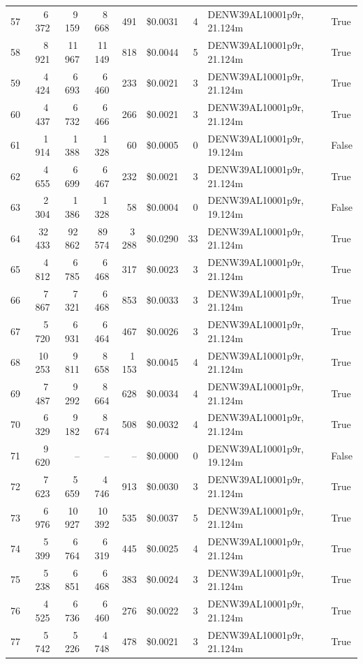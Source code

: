 \documentclass[a4paper,11pt]{article}
\begin{document}
\begin{table}[ht]
\begin{tabular}{r r r r r r r p{3cm} l}
57 & 6\,372 & 9\,159 & 8\,668 & 491 & \$0.0031 & 4 & DENW39AL10001p9r, 21.124m & True \\
58 & 8\,921 & 11\,967 & 11\,149 & 818 & \$0.0044 & 5 & DENW39AL10001p9r, 21.124m & True \\
59 & 4\,424 & 6\,693 & 6\,460 & 233 & \$0.0021 & 3 & DENW39AL10001p9r, 21.124m & True \\
60 & 4\,437 & 6\,732 & 6\,466 & 266 & \$0.0021 & 3 & DENW39AL10001p9r, 21.124m & True \\
61 & 1\,914 & 1\,388 & 1\,328 & 60 & \$0.0005 & 0 & DENW39AL10001p9r, 19.124m & False \\
62 & 4\,655 & 6\,699 & 6\,467 & 232 & \$0.0021 & 3 & DENW39AL10001p9r, 21.124m & True \\
63 & 2\,304 & 1\,386 & 1\,328 & 58 & \$0.0004 & 0 & DENW39AL10001p9r, 19.124m & False \\
64 & 32\,433 & 92\,862 & 89\,574 & 3\,288 & \$0.0290 & 33 & DENW39AL10001p9r, 21.124m & True \\
65 & 4\,812 & 6\,785 & 6\,468 & 317 & \$0.0023 & 3 & DENW39AL10001p9r, 21.124m & True \\
66 & 7\,867 & 7\,321 & 6\,468 & 853 & \$0.0033 & 3 & DENW39AL10001p9r, 21.124m & True \\
67 & 5\,720 & 6\,931 & 6\,464 & 467 & \$0.0026 & 3 & DENW39AL10001p9r, 21.124m & True \\
68 & 10\,253 & 9\,811 & 8\,658 & 1\,153 & \$0.0045 & 4 & DENW39AL10001p9r, 21.124m & True \\
69 & 7\,487 & 9\,292 & 8\,664 & 628 & \$0.0034 & 4 & DENW39AL10001p9r, 21.124m & True \\
70 & 6\,329 & 9\,182 & 8\,674 & 508 & \$0.0032 & 4 & DENW39AL10001p9r, 21.124m & True \\
71 & 9\,620 & -- & -- & -- & \$0.0000 & 0 & DENW39AL10001p9r, 19.124m & False \\
72 & 7\,623 & 5\,659 & 4\,746 & 913 & \$0.0030 & 3 & DENW39AL10001p9r, 21.124m & True \\
73 & 6\,976 & 10\,927 & 10\,392 & 535 & \$0.0037 & 5 & DENW39AL10001p9r, 21.124m & True \\
74 & 5\,399 & 6\,764 & 6\,319 & 445 & \$0.0025 & 4 & DENW39AL10001p9r, 21.124m & True \\
75 & 5\,238 & 6\,851 & 6\,468 & 383 & \$0.0024 & 3 & DENW39AL10001p9r, 21.124m & True \\
76 & 4\,525 & 6\,736 & 6\,460 & 276 & \$0.0022 & 3 & DENW39AL10001p9r, 21.124m & True \\
77 & 5\,742 & 5\,226 & 4\,748 & 478 & \$0.0021 & 3 & DENW39AL10001p9r, 21.124m & True \\

\end{tabular}
\end{table}
\end{document}
